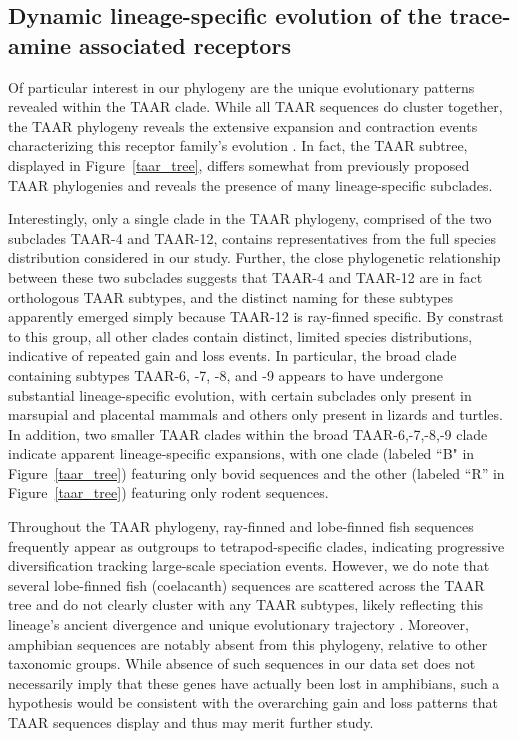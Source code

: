 \documentclass[fleqn,10pt]{wlpeerj}
\begin{document}
\subsection*{Dynamic lineage-specific evolution of the trace-amine associated receptors}
Of particular interest in our phylogeny are the unique evolutionary patterns revealed within the TAAR clade. While all TAAR sequences do cluster together, the TAAR phylogeny reveals the extensive expansion and contraction events characterizing this receptor family's evolution \citep{Lindemann2005,Hashiguchi2007,Staubert2010,Staubert2013}. In fact, the TAAR subtree, displayed in Figure~\ref{taar_tree}, differs somewhat from previously proposed TAAR phylogenies \citep{Lindemann2005, Hashiguchi2007} and reveals the presence of many lineage-specific subclades.

Interestingly, only a single clade in the TAAR phylogeny, comprised of the two subclades TAAR-4 and TAAR-12, contains representatives from the full species distribution considered in our study. Further, the close phylogenetic relationship between these two subclades suggests that TAAR-4 and TAAR-12 are in fact orthologous TAAR subtypes, and the distinct naming for these subtypes apparently emerged simply because TAAR-12 is ray-finned specific. By constrast to this group, all other clades contain distinct, limited species distributions, indicative of repeated gain and loss events. In particular, the broad clade containing subtypes TAAR-6, -7, -8, and -9 appears to have undergone substantial lineage-specific evolution, with certain subclades only present in marsupial and placental mammals and others only present in lizards and turtles. In addition, two smaller TAAR clades within the broad TAAR-6,-7,-8,-9 clade indicate apparent lineage-specific expansions, with one clade (labeled ``B" in Figure~\ref{taar_tree}) featuring only bovid sequences and the other (labeled ``R'' in Figure~\ref{taar_tree}) featuring only rodent sequences.

Throughout the TAAR phylogeny, ray-finned and lobe-finned fish sequences frequently appear as outgroups to tetrapod-specific clades, indicating progressive diversification tracking large-scale speciation events. However, we do note that several lobe-finned fish (coelacanth) sequences are scattered across the TAAR tree and do not clearly cluster with any TAAR subtypes, likely reflecting this lineage's ancient divergence and unique evolutionary trajectory \citep{coelacanth2013}. Moreover, amphibian sequences are notably absent from this phylogeny, relative to other taxonomic groups. While absence of such sequences in our data set does not necessarily imply that these genes have actually been lost in amphibians, such a hypothesis would be consistent with the overarching gain and loss patterns that TAAR sequences display and thus may merit further study.
\end{document}

